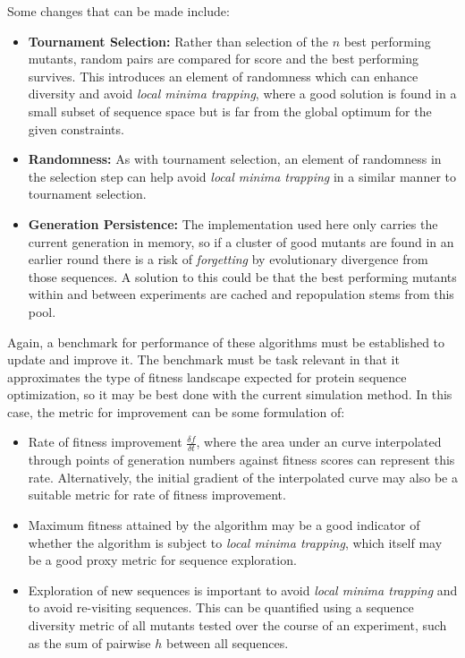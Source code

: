 \documentclass[16pt]{article}
\begin{document}
Some changes that can be made include:
\begin{itemize}
	\item \textbf{Tournament Selection:} Rather than selection of the $n$ best performing mutants, random pairs are compared for score and the best performing survives.
		This introduces an element of randomness which can enhance diversity and avoid \textit{local minima trapping}, where a good solution is found in a small subset of sequence space but is far from the global optimum for the given constraints.
	\item \textbf{Randomness:} As with tournament selection, an element of randomness in the selection step can help avoid \textit{local minima trapping} in a similar manner to tournament selection.
	\item \textbf{Generation Persistence:} The implementation used here only carries the current generation in memory, so if a cluster of good mutants are found in an earlier round there is a risk of \textit{forgetting} by evolutionary divergence from those sequences. 
		A solution to this could be that the best performing mutants within and between experiments are cached and repopulation stems from this pool.
\end{itemize}

Again, a benchmark for performance of these algorithms must be established to update and improve it.
The benchmark must be task relevant in that it approximates the type of fitness landscape expected for protein sequence optimization, so it may be best done with the current simulation method.
In this case, the metric for improvement can be some formulation of:

\begin{itemize}
	\item Rate of fitness improvement $\frac{\delta f}{\delta t}$, where the area under an curve interpolated through points of generation numbers against fitness scores can represent this rate.
		Alternatively, the initial gradient of the interpolated curve may also be a suitable metric for rate of fitness improvement.
	\item Maximum fitness attained by the algorithm may be a good indicator of whether the algorithm is subject to \textit{local minima trapping}, which itself may be a good proxy metric for sequence exploration.
	\item Exploration of new sequences is important to avoid \textit{local minima trapping} and to avoid re-visiting sequences.
		This can be quantified using a sequence diversity metric of all mutants tested over the course of an experiment, such as the sum of pairwise $h$ between all sequences.
\end{itemize}
\end{document}
